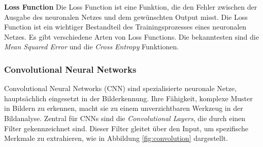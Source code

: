 \documentclass[11pt,a4paper]{article}
\begin{document}
\noindent \newline \textbf{Loss Function} \newline
Die Loss Function ist eine Funktion, die den Fehler zwischen der Ausgabe des neuronalen Netzes und
dem gewünschten Output misst. Die Loss Function ist ein wichtiger Bestandteil des Trainingsprozesses
eines neuronalen Netzes. Es gibt verschiedene Arten von Loss Functions. Die bekanntesten sind die
\textit{Mean Squared Error} und die \textit{Cross Entropy} Funktionen.


\subsubsection{Convolutional Neural Networks}
Convolutional Neural Networks (CNN) sind spezialisierte neuronale Netze, hauptsächlich eingesetzt 
in der Bilderkennung. Ihre Fähigkeit, komplexe Muster in Bildern zu erkennen, macht sie zu einem 
unverzichtbaren Werkzeug in der Bildanalyse. Zentral für CNNs sind die 
\textit{Convolutional Layers}, die durch einen Filter gekennzeichnet sind. Dieser Filter gleitet 
über den Input, um spezifische Merkmale zu extrahieren, wie in Abbildung \ref{fig:convolution} 
dargestellt.
\end{document}
